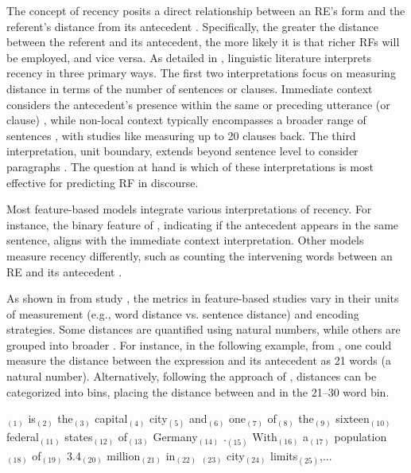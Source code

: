 The concept of recency posits a direct relationship between an RE's form and the referent's distance from its antecedent \citep{vonk1992use,givon1992grammar,Arnold2010}. Specifically, the greater the distance between the referent and its antecedent, the more likely it is that richer RFs will be employed, and vice versa. As detailed in , linguistic literature interprets recency in three primary ways. The first two interpretations focus on measuring distance in terms of the number of sentences or clauses. Immediate context considers the antecedent's presence within the same or preceding utterance (or clause) \citep{hobbs1978resolving,ariel1990accessing,Hitzeman1998,henschel2000pronominalization,poesio2004centering}, while non-local context typically encompasses a broader range of sentences \citep{mccoy1999generating,arnold2009reference}, with studies like \citet{Givon1983} measuring up to 20 clauses back. The third interpretation, unit boundary, extends beyond sentence level to consider paragraphs \citep{Fox1987,Tomlin1987}. The question at hand is which of these interpretations is most effective for predicting RF in discourse.

Most feature-based \context models integrate various interpretations of recency. For instance, the binary feature of \citet{bohnet2008g}, indicating if the antecedent appears in the same sentence, aligns with the immediate context interpretation. Other models measure recency differently, such as counting the intervening words between an RE and its antecedent \citep{bohnet2008g,jamison2008osu}.

As shown in  from study \studB, the metrics in feature-based studies vary in their units of measurement (e.g., word distance vs. sentence distance) and encoding strategies. Some distances are quantified using natural numbers, while others are grouped into broader . For instance, in the following example, from \msrcor \citep{belz2010generating}, one could measure the distance between the expression  and its antecedent  as 21 words (a natural number). Alternatively, following the approach of \citet{castro-ferreira-etal-2016-towards-variation}, distances can be categorized into bins, placing the distance between  and  in the 21–30 word bin.


\ea\label{ex:berlin}
$_{(1)}$ is$_{(2)}$ the$_{(3)}$ capital$_{(4)}$ city$_{(5)}$ and$_{(6)}$ one$_{(7)}$ of$_{(8)}$ the$_{(9)}$ sixteen$_{(10)}$ federal$_{(11)}$ states$_{(12)}$ of$_{(13)}$ Germany$_{(14)}$ .$_{(15)}$ With$_{(16)}$ a$_{(17)}$ population$_{(18)}$ of$_{(19)}$ 3.4$_{(20)}$ million$_{(21)}$ in$_{(22)}$ $_{(23)}$ city$_{(24)}$ limits$_{(25)}$,...
\z
 

